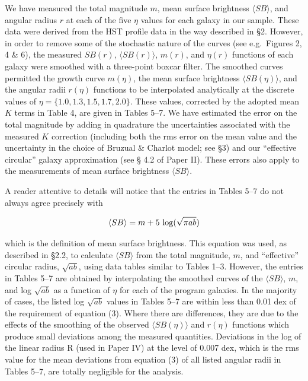 \documentclass[preprint]{aastex}
\begin{document}
We have measured the total magnitude $m$, mean surface brightness
$\langle SB \rangle$, and angular radius $r$ at each of the five
$\eta$ values for each galaxy in our sample. These data were derived
from the HST profile data in the way described in \S 2. However, in
order to remove some of the stochastic nature of the curves (see e.g.\
Figures 2, 4 \& 6), the measured $SB(r)$, $\langle SB(r) \rangle$,
$m(r)$, and $\eta(r)$ functions of each galaxy were smoothed with a
three-point boxcar filter.  The smoothed curves permitted the growth
curve $m(\eta)$, the mean surface brightness $\langle SB(\eta)
\rangle$, and the angular radii $r(\eta)$ functions to be interpolated
analytically at the discrete values of $\eta = \{ 1.0, 1.3, 1.5, 1.7,
2.0\}$. These values, corrected by the adopted mean $K$ terms in Table
4, are given in Tables 5--7. We have estimated the error on the total
magnitude by adding in quadrature the uncertainties associated with
the measured $K$ correction (including both the rms error on the mean
value and the uncertainty in the choice of Bruzual \& Charlot model;
see \S 3) and our ``effective circular'' galaxy approximation (see \S
4.2 of Paper II). These errors also apply to the measurements of mean
surface brightness $\langle SB \rangle$.

A reader attentive to details will notice that the entries in Tables
5--7 do not always agree precisely with

\begin{equation}
           \langle SB \rangle = m + 5~{\rm log} (\sqrt{\pi ab})
\end{equation}

\noindent which is the definition of mean surface brightness. This
equation was used, as described in \S 2.2, to calculate $\langle SB
\rangle$ from the total magnitude, $m$, and ``effective'' circular
radius, $\sqrt{ab}$, using data tables similar to Tables 1--3.
However, the entries in Tables 5--7 are obtained by interpolating the
smoothed curves of the $\langle SB \rangle$, $m$, and log $\sqrt{ab}$
as a function of $\eta$ for each of the program galaxies. In the
majority of cases, the listed log $\sqrt{ab}$ values in Tables 5--7
are within less than 0.01 dex of the requirement of equation (3).
Where there are differences, they are due to the effects of the
smoothing of the observed $\langle SB(\eta) \rangle$ and $r(\eta)$
functions which produce small deviations among the measured
quantities.  Deviations in the log of the linear radius R (used in
Paper IV) at the level of 0.007 dex, which is the rms value for the
mean deviations from equation (3) of all listed angular radii in
Tables 5--7, are totally negligible for the analysis.
\end{document}
